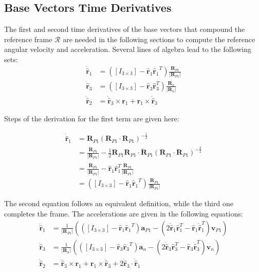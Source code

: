 \subsection{Base Vectors Time Derivatives}
The first and second time derivatives of the base vectors that compound the reference frame $\mathcal{R}$ are needed in the following sections to compute the reference angular velocity and acceleration. Several lines of algebra lead to the following sets:
\begin{subequations}
	\begin{align}
		\dot{\hat{\bm{r}}}_1 &= ([I_{3\times3}] - {\hat{\bm{r}}_1}{\hat{\bm{r}}_1}^T)  \frac{{\bm R}_{P1}} {|{\bm R}_{P1}|} \\
		\dot{\hat{\bm{r}}}_3 &= ([I_{3\times3}] - \hat{\bm{r}}_3 \hat{\bm{r}}_3^T)  \frac{{\bm R}_{n}} {|{\bm R}_{n}|} \\
		\dot{\hat{\bm{r}}}_2 &= \dot{\hat{\bm{r}}}_3 \times \bm{r}_1 +  \bm{r}_1  \times \dot{\hat{\bm{r}}}_3 
	\end{align}
\end{subequations}

Steps of the derivation for the first term are given here:

\begin{subequations}
	\begin{align}
		\dot{\hat{\bm{r}}}_1 &= {\bm R}_{P1} \left( {\bm R}_{P1} \cdot {\bm R}_{P1} \right)^{-\frac{1}{2}} \\
		 &= \frac{\dot{\bm R}_{P1}}{|{\bm R}_{P1}|} -  \frac{1}{2} {\bm R}_{P1} {\bm R}_{P1}\cdot \dot{\bm R}_{P1} \left({\bm R}_{P1} \cdot {\bm R}_{P1} \right)^{-\frac{3}{2}} \\
		 &= \frac{\dot{\bm R}_{P1}}{|{\bm R}_{P1}|} -  \hat{\bm r}_1 \hat{\bm r}_{1}^T \frac{\dot{\bm R}_{P1}}{|{\bm R}_{P1}|} \\
		 &=([I_{3\times3}] - {\hat{\bm{r}}_1}{\hat{\bm{r}}_1}^T)  \frac{{\bm R}_{P1}}{|{\bm R}_{P1}|}
	\end{align}
\end{subequations}

The second equation follows an equivalent definition, while the third one completes the frame. The accelerations are given in the following equations:
\begin{subequations}
	\begin{align}
		\ddot{\hat{\bm{r}}}_1 &=  \frac{1}{|{\bm R}_{P1}|}\left(([I_{3\times3}] - {\hat{\bm{r}}_1}{\hat{\bm{r}}_1}^T)  \bm{a}_{P1} - \left(2\dot{\hat{\bm{r}}}_1 \hat{\bm{r}}_1^T  - \hat{\bm{r}}_1 \dot{\hat{\bm{r}}}_1^T \right)  \bm{v}_{P1} \right) \\
		\ddot{\hat{\bm{r}}}_3 &= \frac{1}{|{\bm R}_{n}|}
		\left(
		([I_{3\times3}] - {\hat{\bm{r}}_3}{\hat{\bm{r}}_3}^T)  \bm{a}_{n} - \left(
		2\dot{\hat{\bm{r}}}_3 \hat{\bm{r}}_3 ^T - 
		\hat{\bm{r}}_3 \dot{\hat{\bm{r}}}_3^T \right) \bm{v}_{n}\right) 
		 \\
		\ddot{\hat{\bm{r}}}_2 &= \ddot{\hat{\bm{r}}}_3 \times \bm{r}_1 +  \bm{r}_1  \times \ddot{\hat{\bm{r}}}_3 + 2\dot{\hat{\bm{r}}}_3 \cdot \dot{\hat{\bm{r}}}_1
	\end{align}
\end{subequations}

